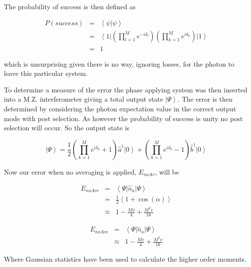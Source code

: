 \documentclass[aps,pra,twocolumn,superscriptaddress,numerical]{revtex4-1}
\begin{document}
			
			The probability of success is then defined as
			
			\begin{eqnarray}
				P\left(success\right) & = & \left\langle \psi|\psi\right\rangle \nonumber \\
				& = & \left\langle 1\right|\left(\prod_{l=1}^{M}e^{-i\delta_{l}}\right)\left(\prod_{k=1}^{M}e^{i\delta_{k}}\right)\left|1\right\rangle \nonumber \\
				& = & 1\label{eq:noAveProbSuccess}
			\end{eqnarray}
			
			
			which is unsurprising given there is no way, ignoring losses, for the photon to leave this particular system.
			
			To determine a measure of the error the phase applying system was then inserted into a M.Z. interferometer giving a total output state $\left|\Psi\right\rangle $. The error is then determined by considering the photon expectation value in the correct output mode with post selection. As however the probability of success is unity no post selection will occur. So the output state is
			
			\begin{equation}
				\left|\Psi\right\rangle 	=\frac{1}{2}\left(\prod_{k=1}^{M}e^{i\delta_{k}}+1\right)\hat{a}^{\dagger}\left|0\right\rangle +\left(\prod_{k=1}^{M}e^{i\delta_{k}}-1\right)\hat{b}^{\dagger}\left|0\right\rangle \label{eq:noAveIntState}
			\end{equation}
			
			
			Now our error when no averaging is applied, $E_{noAv}$, will be
			
			\begin{eqnarray}
				E_{noAve} & = & \left\langle \Psi\right|\hat{n}_{a}\left|\Psi\right\rangle \nonumber \\
				& = & \frac{1}{2}\left\langle 1+\cos\left(\alpha\right)\right\rangle \nonumber \\
				& \approx & 1-\frac{Mv}{4}+\frac{M^{2}v}{16}\label{eq:ErrorNoAv1}
			\end{eqnarray}
			
			
			\begin{eqnarray}
				E_{noAve} & = & \left\langle \Psi\right|\hat{n}_{a}\left|\Psi\right\rangle \nonumber \\
				& \approx & 1-\frac{Mv}{4}+\frac{M^{2}v}{16}\label{eq:ErrorNoAv}
			\end{eqnarray}
			
			Where Gaussian statistics have been used to calculate the higher order moments.
			
\end{document}
